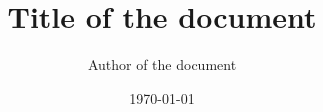 \title{Title of the document}
\author{Author of the document}
\date{\today}


\newcommand{\acknowledge}{
    Acknowledge
}

\newcommand{\makeabstract}{
    \begin{abstract}
        Abstract of the paper.
    \end{abstract}
}
